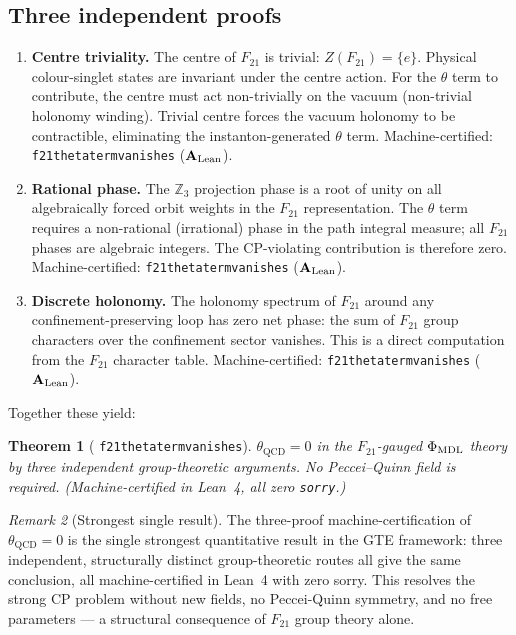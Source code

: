 \documentclass[11pt]{article}
\newtheorem{theorem}{Theorem}[section]
\theoremstyle{remark}
\newtheorem{remark}[theorem]{Remark}
\newcommand{\QCD}{\text{QCD}}
\newcommand{\ZZ}{\mathbb{Z}}
\newcommand{\phimdl}{\Phi_{\rm MDL}}
\newcommand{\Ftwentyone}{F_{21}}
\newcommand{\lean}[1]{%
  \penalty-100
  \begingroup\def\_{\textunderscore\allowbreak}\texttt{#1}\endgroup}
\newcommand{\CatAL}{\ensuremath{\textbf{A}_{\rm Lean}}}
\begin{document}
\subsection{Three independent proofs}
\label{ssec:cpproofs}

\begin{enumerate}[leftmargin=2em,label=\textbf{Proof \arabic*.}]
\item \textbf{Centre triviality.}
The centre of $\Ftwentyone$ is trivial: $Z(\Ftwentyone) = \{e\}$.
Physical colour-singlet states are invariant under the centre action.
For the $\theta$ term to contribute, the centre must act non-trivially on the
vacuum (non-trivial holonomy winding).
Trivial centre forces the vacuum holonomy to be contractible, eliminating the
instanton-generated $\theta$ term.
Machine-certified: \lean{f21\_theta\_term\_vanishes} (\CatAL{}).

\item \textbf{Rational phase.}
The $\ZZ_3$ projection phase is a root of unity on all algebraically forced
orbit weights in the $\Ftwentyone$ representation.
The $\theta$ term requires a non-rational (irrational) phase in the path
integral measure; all $\Ftwentyone$ phases are algebraic integers.
The CP-violating contribution is therefore zero.
Machine-certified: \lean{f21\_theta\_term\_vanishes} (\CatAL{}).

\item \textbf{Discrete holonomy.}
The holonomy spectrum of $\Ftwentyone$ around any confinement-preserving loop
has zero net phase: the sum of $\Ftwentyone$ group characters over the
confinement sector vanishes.
This is a direct computation from the $\Ftwentyone$ character table.
Machine-certified: \lean{f21\_theta\_term\_vanishes} (\CatAL{}).
\end{enumerate}

Together these yield:
\begin{theorem}[\lean{f21\_theta\_term\_vanishes}]
$\theta_{\QCD} = 0$ in the $\Ftwentyone$-gauged $\phimdl$ theory by three
independent group-theoretic arguments.
No Peccei--Quinn field is required.
(Machine-certified in Lean~4, all zero \texttt{sorry}.)
\end{theorem}

\begin{remark}[Strongest single result]
The three-proof machine-certification of $\theta_{\QCD} = 0$ is the single
strongest quantitative result in the GTE framework: three independent,
structurally distinct group-theoretic routes all give the same conclusion,
all machine-certified in Lean~4 with zero sorry.
This resolves the strong CP problem without new fields, no Peccei-Quinn symmetry,
and no free parameters --- a structural consequence of $F_{21}$ group theory alone.
\end{remark}
\end{document}
